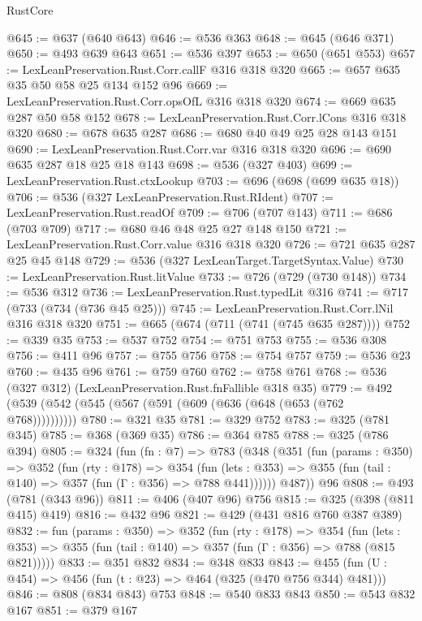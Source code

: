 \begin{lexlean}{RustCore}
\begin{coremodule}
@645 := @637 (@640 @643)
@646 := @536 @363
@648 := @645 (@646 @371)
@650 := @493 @639 @643
@651 := @536 @397
@653 := @650 (@651 @553)
@657 := LexLeanPreservation.Rust.Corr.callF @316 @318 @320
@665 := @657 @635 @35 @50 @58 @25 @134 @152 @96
@669 := LexLeanPreservation.Rust.Corr.opsOfL @316 @318 @320
@674 := @669 @635 @287 @50 @58 @152
@678 := LexLeanPreservation.Rust.Corr.lCons @316 @318 @320
@680 := @678 @635 @287
@686 := @680 @40 @49 @25 @28 @143 @151
@690 := LexLeanPreservation.Rust.Corr.var @316 @318 @320
@696 := @690 @635 @287 @18 @25 @18 @143
@698 := @536 (@327 @403)
@699 := LexLeanPreservation.Rust.ctxLookup
@703 := @696 (@698 (@699 @635 @18))
@706 := @536 (@327 LexLeanPreservation.Rust.RIdent)
@707 := LexLeanPreservation.Rust.readOf
@709 := @706 (@707 @143)
@711 := @686 (@703 @709)
@717 := @680 @46 @48 @25 @27 @148 @150
@721 := LexLeanPreservation.Rust.Corr.value @316 @318 @320
@726 := @721 @635 @287 @25 @45 @148
@729 := @536 (@327 LexLeanTarget.TargetSyntax.Value)
@730 := LexLeanPreservation.Rust.litValue
@733 := @726 (@729 (@730 @148))
@734 := @536 @312
@736 := LexLeanPreservation.Rust.typedLit @316
@741 := @717 (@733 (@734 (@736 @45 @25)))
@745 := LexLeanPreservation.Rust.Corr.lNil @316 @318 @320
@751 := @665 (@674 (@711 (@741 (@745 @635 @287))))
@752 := @339 @35
@753 := @537 @752
@754 := @751 @753
@755 := @536 @308
@756 := @411 @96
@757 := @755 @756
@758 := @754 @757
@759 := @536 @23
@760 := @435 @96
@761 := @759 @760
@762 := @758 @761
@768 := @536 (@327 @312) (LexLeanPreservation.Rust.fnFallible @318 @35)
@779 := @492 (@539 (@542 (@545 (@567 (@591 (@609 (@636 (@648 (@653 (@762 @768))))))))))
@780 := @321 @35
@781 := @329 @752
@783 := @325 (@781 @345)
@785 := @368 (@369 @35)
@786 := @364 @785
@788 := @325 (@786 @394)
@805 := @324
    (fun (fn : @7) =>
    @783
      (@348
        (@351
          (fun (params : @350) =>
          @352
            (fun (rty : @178) =>
            @354
              (fun (lets : @353) =>
              @355 (fun (tail : @140) => @357 (fun (Γ : @356) => @788 @441))))))
        @487))
    @96
@808 := @493 (@781 (@343 @96))
@811 := @406 (@407 @96) @756
@815 := @325 (@398 (@811 @415) @419)
@816 := @432 @96
@821 := @429 (@431 @816 @760 @387 @389)
@832 := fun (params : @350) =>
  @352
    (fun (rty : @178) =>
    @354
      (fun (lets : @353) => @355 (fun (tail : @140) => @357 (fun (Γ : @356) => @788 (@815 @821)))))
@833 := @351 @832
@834 := @348 @833
@843 := @455 (fun (U : @454) => @456 (fun (t : @23) => @464 (@325 (@470 @756 @344) @481)))
@846 := @808 (@834 @843) @753
@848 := @540 @833 @843
@850 := @543 @832 @167
@851 := @379 @167

\end{coremodule}
\end{lexlean}
